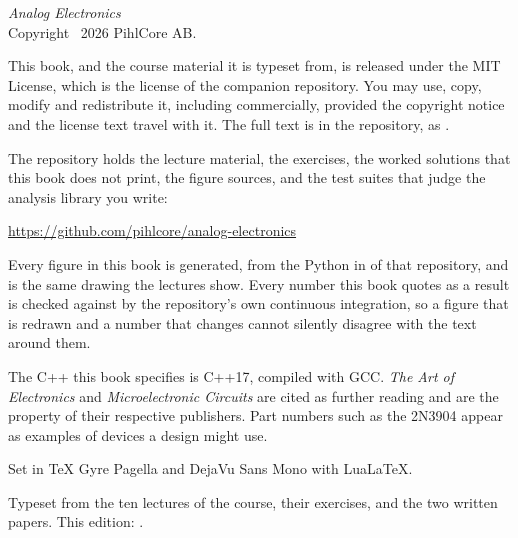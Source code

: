 \thispagestyle{empty}
\vspace*{\fill}
{\small
\noindent\textit{Analog Electronics}\\
Copyright \textcopyright\ 2026 PihlCore AB.

\medskip
\noindent This book, and the course material it is typeset from, is released under the MIT
License, which is the license of the companion repository. You may use, copy, modify and
redistribute it, including commercially, provided the copyright notice and the license text
travel with it. The full text is in the repository, as .

\medskip
\noindent The repository holds the lecture material, the exercises, the worked solutions that
this book does not print, the figure sources, and the test suites that judge the analysis library
you write:

\medskip
\noindent\url{https://github.com/pihlcore/analog-electronics}

\medskip
\noindent Every figure in this book is generated, from the Python in  of that
repository, and is the same drawing the lectures show. Every number this book quotes as a result
is checked against  by the repository's own continuous integration, so a
figure that is redrawn and a number that changes cannot silently disagree with the text around
them.

\medskip
\noindent The C++ this book specifies is C++17, compiled with GCC. \textit{The Art of
Electronics} and \textit{Microelectronic Circuits} are cited as further reading and are the
property of their respective publishers. Part numbers such as the 2N3904 appear as examples of
devices a design might use.

\medskip
\noindent Set in TeX Gyre Pagella and DejaVu Sans Mono with Lua\LaTeX.

\medskip
\noindent\textcolor{muted}{Typeset from the ten lectures of the course, their exercises, and the
two written papers. This edition: \bookedition.}
\par}
\cleardoublepage
